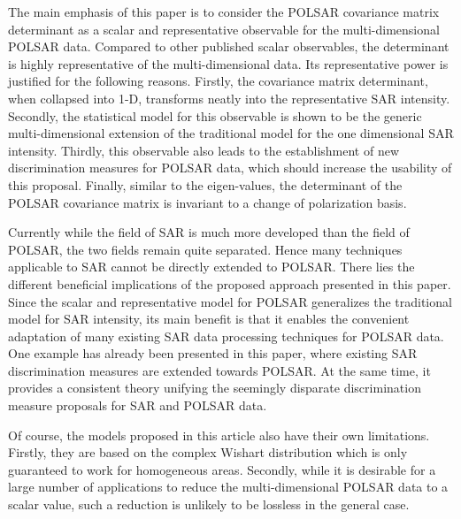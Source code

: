 \documentclass[printer]{tRSL2e}
\begin{document}
The main emphasis of this paper is to consider the POLSAR covariance matrix determinant as a scalar and representative observable for the multi-dimensional POLSAR data.
Compared to other published scalar observables, the determinant is highly representative of the multi-dimensional data.
Its representative power is justified for the following reasons.
Firstly, the covariance matrix determinant, when collapsed into 1-D, transforms neatly into the representative SAR intensity.
Secondly, the statistical model for this observable is shown to be the generic multi-dimensional extension of the traditional model for the one dimensional SAR intensity.
Thirdly, this observable also leads to the establishment of new discrimination measures for POLSAR data, which should increase the usability of this proposal.
Finally, similar to the eigen-values, the determinant of the POLSAR covariance matrix is invariant to a change of polarization basis.

Currently while the field of SAR is much more developed than the field of POLSAR,  the two fields remain  quite separated.
Hence many techniques applicable to SAR cannot be directly extended to POLSAR.
There lies the different beneficial implications of the proposed approach presented in this paper.
Since the scalar and representative model for POLSAR generalizes the traditional model for SAR intensity,
  its main benefit is that it enables the convenient adaptation of many existing SAR data processing techniques for POLSAR data.
One example has already been presented in this paper, 
  where existing SAR discrimination measures are extended towards POLSAR.
At the same time, it provides a consistent theory unifying the seemingly disparate discrimination measure proposals for SAR and POLSAR data.  

Of course, the models proposed in this article also have their own limitations.
Firstly, they are based on the complex Wishart distribution
  which is only guaranteed to work for homogeneous areas.
Secondly, while it is desirable for a large number of applications to reduce the multi-dimensional POLSAR data to a scalar value, such a reduction is unlikely to be lossless in the general case.
\end{document}
